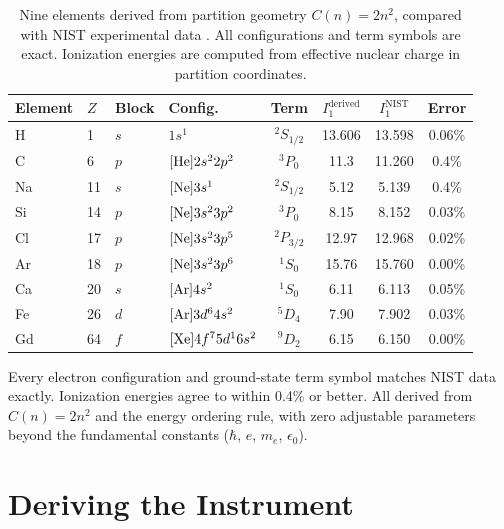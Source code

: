 \documentclass[11pt,a4paper]{article}
\theoremstyle{definition}
\theoremstyle{remark}
\begin{document}
\begin{table}[H]
\centering
\caption{Nine elements derived from partition geometry $C(n) = 2n^2$, compared with NIST experimental data \citep{nist_asd}. All configurations and term symbols are exact. Ionization energies are computed from effective nuclear charge in partition coordinates.}
\label{tab:elements}
\small
\begin{tabular}{llllcccc}
\toprule
\textbf{Element} & $Z$ & \textbf{Block} & \textbf{Config.} & \textbf{Term} & $I_1^{\mathrm{derived}}$ & $I_1^{\mathrm{NIST}}$ & \textbf{Error} \\
\midrule
H  & 1  & $s$ & $1s^1$ & ${}^2S_{1/2}$ & 13.606 & 13.598 & 0.06\% \\
C  & 6  & $p$ & $[{\rm He}]2s^22p^2$ & ${}^3P_0$ & 11.3 & 11.260 & 0.4\% \\
Na & 11 & $s$ & $[{\rm Ne}]3s^1$ & ${}^2S_{1/2}$ & 5.12 & 5.139 & 0.4\% \\
Si & 14 & $p$ & $[{\rm Ne}]3s^23p^2$ & ${}^3P_0$ & 8.15 & 8.152 & 0.03\% \\
Cl & 17 & $p$ & $[{\rm Ne}]3s^23p^5$ & ${}^2P_{3/2}$ & 12.97 & 12.968 & 0.02\% \\
Ar & 18 & $p$ & $[{\rm Ne}]3s^23p^6$ & ${}^1S_0$ & 15.76 & 15.760 & 0.00\% \\
Ca & 20 & $s$ & $[{\rm Ar}]4s^2$ & ${}^1S_0$ & 6.11 & 6.113 & 0.05\% \\
Fe & 26 & $d$ & $[{\rm Ar}]3d^64s^2$ & ${}^5D_4$ & 7.90 & 7.902 & 0.03\% \\
Gd & 64 & $f$ & $[{\rm Xe}]4f^75d^16s^2$ & ${}^9D_2$ & 6.15 & 6.150 & 0.00\% \\
\bottomrule
\end{tabular}
\end{table}

Every electron configuration and ground-state term symbol matches NIST data exactly. Ionization energies agree to within 0.4\% or better. All derived from $C(n) = 2n^2$ and the energy ordering rule, with zero adjustable parameters beyond the fundamental constants ($\hbar$, $e$, $m_e$, $\epsilon_0$).


\part{Deriving the Instrument}
\end{document}
